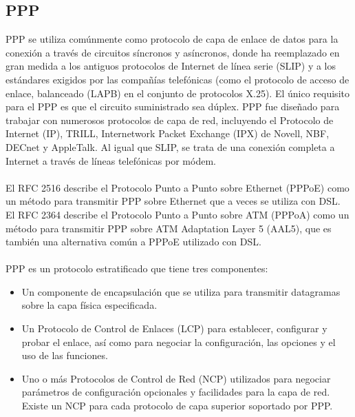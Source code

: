 \documentclass[12pt,letterpaper]{article}
\begin{document}
\subsection{PPP}
PPP se utiliza comúnmente como protocolo de capa de enlace de datos para la conexión a través 
de circuitos síncronos y asíncronos, donde ha reemplazado en gran medida a los antiguos 
protocolos de Internet de línea serie (SLIP) y a los estándares exigidos por las compañías 
telefónicas (como el protocolo de acceso de enlace, balanceado (LAPB) en el conjunto de 
protocolos X.25). El único requisito para el PPP es que el circuito suministrado sea dúplex. 
PPP fue diseñado para trabajar con numerosos protocolos de capa de red, incluyendo el 
Protocolo de Internet (IP), TRILL, Internetwork Packet Exchange (IPX) de Novell, NBF, 
DECnet y AppleTalk. Al igual que SLIP, se trata de una conexión completa a Internet a 
través de líneas telefónicas por módem. 
\\ \\
El RFC 2516 describe el Protocolo Punto a Punto sobre Ethernet (PPPoE) como un método para 
transmitir PPP sobre Ethernet que a veces se utiliza con DSL. El RFC 2364 describe el 
Protocolo Punto a Punto sobre ATM (PPPoA) como un método para transmitir PPP sobre ATM 
Adaptation Layer 5 (AAL5), que es también una alternativa común a PPPoE utilizado con DSL.
\\ \\
PPP es un protocolo estratificado que tiene tres componentes:
\begin{itemize}
    \item Un componente de encapsulación que se utiliza para transmitir datagramas sobre la capa física especificada.
    \item Un Protocolo de Control de Enlaces (LCP) para establecer, configurar y probar el enlace, así como para negociar la configuración, las opciones y el uso de las funciones.
    \item Uno o más Protocolos de Control de Red (NCP) utilizados para negociar parámetros de configuración opcionales y facilidades para la capa de red. Existe un NCP para cada protocolo de capa superior soportado por PPP.
\end{itemize}
\end{document}

